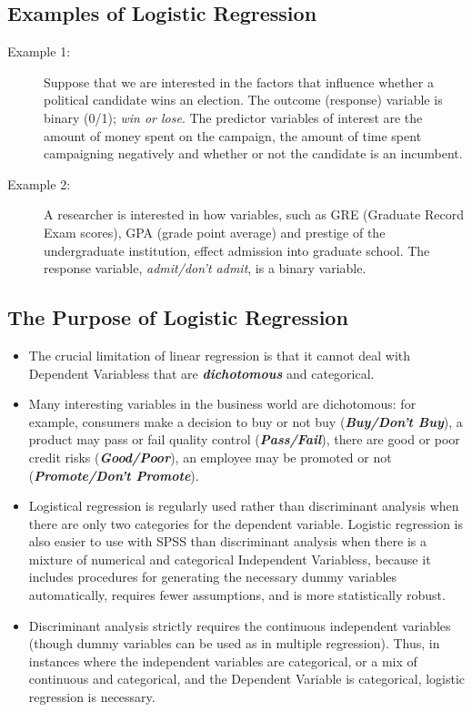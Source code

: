 \documentclass[a4paper,12pt]{article}
\begin{document}
\subsection*{Examples of Logistic Regression}

\begin{description}
	\item[Example 1:]  Suppose that we are interested in the factors that influence whether a political candidate wins an election.  The outcome (response) variable is binary (0/1); \textit{ win or lose}.  The predictor variables of interest are the amount of money spent on the campaign, the amount of time spent campaigning negatively and whether or not the candidate is an incumbent.
	
	\item[Example 2:]  A researcher is interested in how variables, such as GRE (Graduate Record Exam scores), GPA (grade point average) and prestige of the undergraduate institution, effect admission into graduate school. The response variable, \textit{admit/don't admit}, is a binary variable.
\end{description}


\subsection*{The Purpose of Logistic Regression}
\begin{itemize}
	\item The crucial limitation of linear regression is that it cannot deal with Dependent Variabless that are \textbf{\textit{dichotomous}} and categorical. 
	\item Many interesting variables in the business world are dichotomous: for
	example, consumers make a decision to buy or not buy (\textit{\textbf{Buy/Don't Buy}}), a product may pass or fail quality control (\textit{\textbf{Pass/Fail}}), there are good or poor credit risks (\textit{\textbf{Good/Poor}}), an employee may be promoted or not (\textit{\textbf{Promote/Don't Promote}}).
	

	
	\item 	Logistical regression is regularly used rather than discriminant analysis when there are only two categories
	for the dependent variable. Logistic regression is also easier to use with SPSS than discriminant analysis when
	there is a mixture of numerical and categorical Independent Variabless, because it includes procedures for
	generating the necessary dummy variables automatically, requires fewer assumptions, and
	is more statistically robust. 
	
	\item Discriminant analysis strictly requires the continuous independent variables  (though dummy variables can be used as in multiple regression). Thus, in instances where
	the independent variables are categorical, or a mix of continuous and categorical, and the
	Dependent Variable is categorical, logistic regression is necessary.
\end{itemize}
\end{document}
